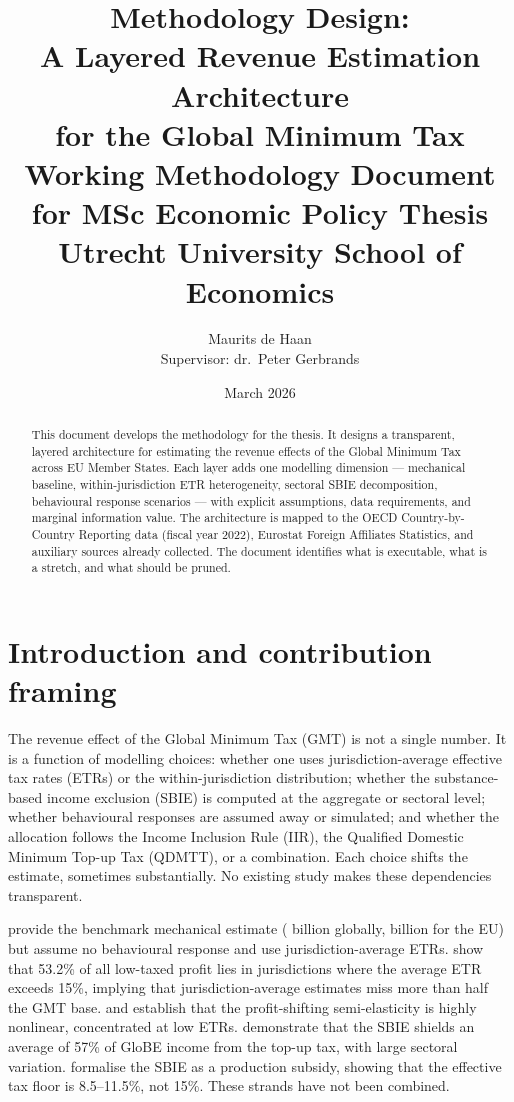 \documentclass[11pt,a4paper]{article}
\title{\textbf{Methodology Design: \\ A Layered Revenue Estimation Architecture \\ for the Global Minimum Tax}\\[0.5em]
\large Working Methodology Document for MSc Economic Policy Thesis\\
Utrecht University School of Economics}
\author{Maurits de Haan\\[0.3em]
\small Supervisor: dr.\ Peter Gerbrands}
\date{March 2026}
\newcommand{\EUR}{\texteuro}
\begin{document}
\maketitle

\begin{abstract}
\noindent
This document develops the methodology for the thesis. It designs a transparent, layered architecture for estimating the revenue effects of the Global Minimum Tax across EU Member States. Each layer adds one modelling dimension --- mechanical baseline, within-jurisdiction ETR heterogeneity, sectoral SBIE decomposition, behavioural response scenarios --- with explicit assumptions, data requirements, and marginal information value. The architecture is mapped to the OECD Country-by-Country Reporting data (fiscal year 2022), Eurostat Foreign Affiliates Statistics, and auxiliary sources already collected. The document identifies what is executable, what is a stretch, and what should be pruned.
\end{abstract}

\newpage
\tableofcontents
\newpage

\section{Introduction and contribution framing}\label{sec:intro}

The revenue effect of the Global Minimum Tax (GMT) is not a single number. It is a function of modelling choices: whether one uses jurisdiction-average effective tax rates (ETRs) or the within-jurisdiction distribution; whether the substance-based income exclusion (SBIE) is computed at the aggregate or sectoral level; whether behavioural responses are assumed away or simulated; and whether the allocation follows the Income Inclusion Rule (IIR), the Qualified Domestic Minimum Top-up Tax (QDMTT), or a combination. Each choice shifts the estimate, sometimes substantially. No existing study makes these dependencies transparent.

\citet{barake2022} provide the benchmark mechanical estimate (\EUR179 billion globally, \EUR55 billion for the EU) but assume no behavioural response and use jurisdiction-average ETRs. \citet{hugger2025} show that 53.2\% of all low-taxed profit lies in jurisdictions where the average ETR exceeds 15\%, implying that jurisdiction-average estimates miss more than half the GMT base. \citet{dowd2017} and \citet{garcia2024} establish that the profit-shifting semi-elasticity is highly nonlinear, concentrated at low ETRs. \citet{devereux2023} demonstrate that the SBIE shields an average of 57\% of GloBE income from the top-up tax, with large sectoral variation. \citet{schjelderup2024} formalise the SBIE as a production subsidy, showing that the effective tax floor is 8.5--11.5\%, not 15\%. These strands have not been combined.
\end{document}
